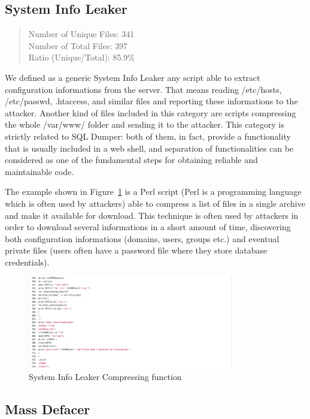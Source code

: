 \subsection{System Info Leaker}

\begin{quote}
Number of Unique Files: 341\\
Number of Total Files: 397\\
Ratio (Unique/Total): 85.9\%
\end{quote}

We defined as a generic System Info Leaker any script able to extract configuration informations from the server. That means reading /etc/hosts, /etc/passwd, .htaccess, and similar files and reporting these informations to the attacker. Another kind of files included in this category are scripts compressing the whole /var/www/ folder and sending it to the attacker.
This category is strictly related to SQL Dumper: both of them, in fact, provide a functionality that is usually included in a web shell, and separation of functionalities can be considered as one of the fundamental steps for obtaining reliable and maintainable code.

The example shown in Figure~\ref{fig:SysInfoLeaker} is a Perl script (Perl is a programming language which is often used by attackers) able to compress a list of files in a single archive and make it available for download. This technique is often used by attackers in order to download several informations in a short amount of time, discovering both configuration informations (domains, users, groups etc.) and eventual private files (users often have a password file where they store database credentials).

\begin{figure}[H]
\centerline{\includegraphics[width=0.8\textwidth]{Images/SysInfoLeaker.jpg}}
\caption{System Info Leaker Compressing function\label{fig:SysInfoLeaker}}
\end{figure}

\subsection{Mass Defacer}

